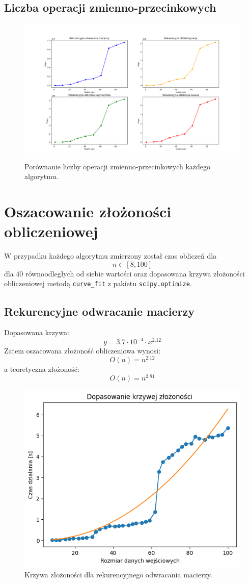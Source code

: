 \documentclass[11pt, leqno]{scrartcl}
\begin{document}
    \subsection{Liczba operacji zmienno-przecinkowych}
    \begin{figure}[H]
        \centering
        \includegraphics[width=0.8\linewidth]{zad2_flops.png}
        \caption{Porównanie liczby operacji zmienno-przecinkowych
            każdego algorytmu.}
    \end{figure}

    \section{Oszacowanie złożoności obliczeniowej}
    W przypadku każdego algorytmu zmierzony został czas obliczeń dla
    \[
        n \in [8,100]
    \]
    dla $40$ równoodległych od siebie wartości oraz dopasowana krzywa
    złożoności obliczeniowej metodą \texttt{curve\_fit} z pakietu
    \texttt{scipy.optimize}.

    \subsection{Rekurencyjne odwracanie macierzy}
    Dopasowana krzywa:
    \[
        y=3.7 \cdot 10^{-4} \cdot x^{2.12}
    \]
    Zatem oszacowana złożoność obliczeniowa wynosi:
    \[
        O(n)=n^{2.12}
    \]
    a teoretyczna złożoność:
    \[
        O(n)=n^{2.81}
    \]
    \begin{figure}[H]
        \centering
        \includegraphics[width=0.7\linewidth]{zlozonosc_rek_mnozenie.png}
        \caption{Krzywa złożoności dla rekurencyjnego odwracania macierzy.}
    \end{figure}
\end{document}
